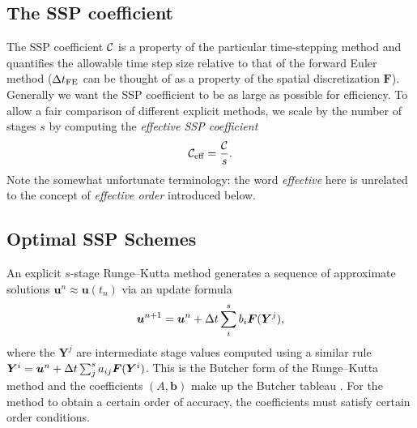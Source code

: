\subsection{The SSP coefficient}

The SSP coefficient $\mathcal{C}$ is a property of the particular time-stepping method and quantifies the allowable time step size relative to that of the forward Euler method
($\Delta t_{\text{FE}}$ can be thought of as a property of the spatial discretization $\bm{F}$).
Generally we want the SSP coefficient to be as large as possible for efficiency.
To allow a fair comparison of different explicit methods, we scale by the number of stages $s$ by computing the \emph{effective SSP coefficient}
$$\mathcal{C}_{\text{eff}} = \frac{\mathcal{C}}{s}.$$
Note the somewhat unfortunate terminology: the word \emph{effective} here is unrelated to the concept of \emph{effective order} introduced below.


\subsection{Optimal SSP Schemes}\label{subsec:Optimal_SSPRK}


An explicit $s$-stage Runge--Kutta method generates a sequence of approximate solutions $\bm{u}^n \approx \bm{u}(t_n)$ via an update formula
$$\bm{u}^{n+1} = \bm{u}^{n} + \Delta t \sum_i^s b_i \bm{F}(\bm{Y}^j),$$
where the $\bm{Y}^j$ are intermediate stage values computed using a similar rule
$\bm{Y}^{i} = \bm{u}^{n} + \Delta t \sum_j^s a_{ij} \bm{F}(\bm{Y}^i)$.
This is the Butcher form of the Runge--Kutta method and the coefficients $(A,\bm{b})$ make up the Butcher tableau \cite{Butcher2008_book}.
For the method to obtain a certain order of accuracy, the coefficients must satisfy certain order conditions.

